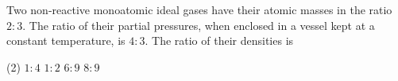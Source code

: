
\item Two non-reactive monoatomic ideal gases have their atomic masses in the ratio \( 2 : 3 \). The ratio of their partial pressures, when enclosed in a vessel kept at a constant temperature, is \( 4 : 3 \). The ratio of their densities is
    \begin{tasks}(2)
        \task \( 1 : 4 \)
        \task \( 1 : 2 \)
        \task \( 6 : 9 \)
        \task \( 8 : 9 \)
    \end{tasks}
